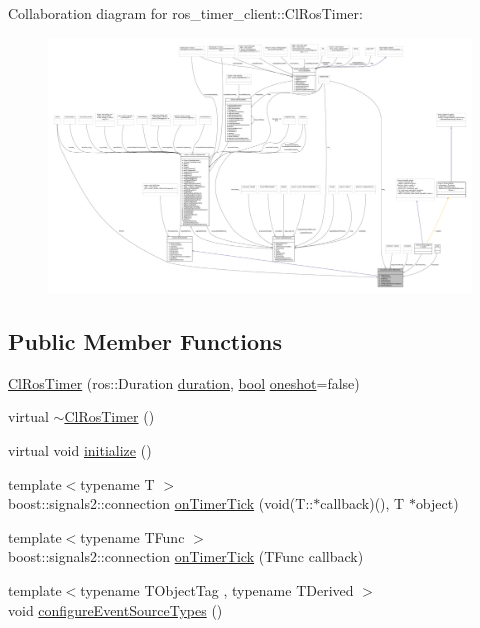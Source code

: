 Collaboration diagram for ros\+\_\+timer\+\_\+client\+:\+:Cl\+Ros\+Timer\+:
\nopagebreak
\begin{figure}[H]
\begin{center}
\leavevmode
\includegraphics[width=350pt]{classros__timer__client_1_1ClRosTimer__coll__graph}
\end{center}
\end{figure}
\subsection*{Public Member Functions}
\begin{DoxyCompactItemize}
\item 
\hyperlink{classros__timer__client_1_1ClRosTimer_a7a8cde0adf8d957dc0fe20f38b6ae1bd}{Cl\+Ros\+Timer} (ros\+::\+Duration \hyperlink{classros__timer__client_1_1ClRosTimer_a79df7a52481e520ba959f3e6afb0a817}{duration}, \hyperlink{classbool}{bool} \hyperlink{classros__timer__client_1_1ClRosTimer_a767e8c7723206bd7a0a49f660418d628}{oneshot}=false)
\item 
virtual \hyperlink{classros__timer__client_1_1ClRosTimer_a099e3ba0adbd67092703bd5c776d6c3f}{$\sim$\+Cl\+Ros\+Timer} ()
\item 
virtual void \hyperlink{classros__timer__client_1_1ClRosTimer_a2d290d2a5d0afa7cdab543b17dbddbff}{initialize} ()
\item 
{\footnotesize template$<$typename T $>$ }\\boost\+::signals2\+::connection \hyperlink{classros__timer__client_1_1ClRosTimer_a06ecf6427b5df59f29879ab3bd1f120c}{on\+Timer\+Tick} (void(T\+::$\ast$callback)(), T $\ast$object)
\item 
{\footnotesize template$<$typename T\+Func $>$ }\\boost\+::signals2\+::connection \hyperlink{classros__timer__client_1_1ClRosTimer_a0ad81e975f7ea9f4b8e947663109c0eb}{on\+Timer\+Tick} (T\+Func callback)
\item 
{\footnotesize template$<$typename T\+Object\+Tag , typename T\+Derived $>$ }\\void \hyperlink{classros__timer__client_1_1ClRosTimer_aab7de28c1ae3d58090fd6031a9b5bc54}{configure\+Event\+Source\+Types} ()
\end{DoxyCompactItemize}
